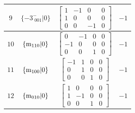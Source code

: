 \documentclass[fleqn,8pt]{jsarticle}
\begin{document}
\begin{longtable}{cccc}
$ 9 $ & $ \{-3^{-}_{\,\,001}|0\} $ & $ \begin{bmatrix} 1 & -1 & 0 & 0 \\ 1 & 0 & 0 & 0 \\ 0 & 0 & -1 & 0 \end{bmatrix} $ & $ -1 $ \\ \hline
$ 10 $ & $ \{{\rm m}_{110}|0\} $ & $ \begin{bmatrix} 0 & -1 & 0 & 0 \\ -1 & 0 & 0 & 0 \\ 0 & 0 & 1 & 0 \end{bmatrix} $ & $ -1 $ \\ \hline
$ 11 $ & $ \{{\rm m}_{100}|0\} $ & $ \begin{bmatrix} -1 & 1 & 0 & 0 \\ 0 & 1 & 0 & 0 \\ 0 & 0 & 1 & 0 \end{bmatrix} $ & $ -1 $ \\ \hline
$ 12 $ & $ \{{\rm m}_{010}|0\} $ & $ \begin{bmatrix} 1 & 0 & 0 & 0 \\ 1 & -1 & 0 & 0 \\ 0 & 0 & 1 & 0 \end{bmatrix} $ & $ -1 $ \\
\end{longtable}
\end{document}
